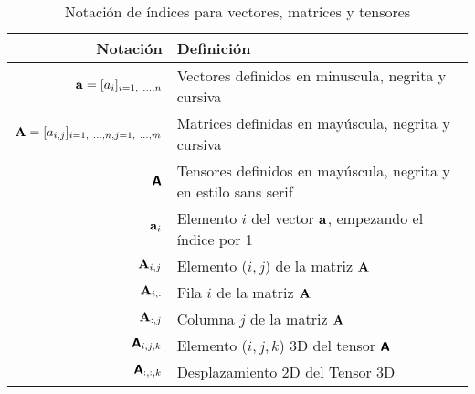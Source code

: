 \begin{table}[H]
    \begin{center}
        \begin{tabularx}{\textwidth}{|r|X|}
            \hline
            \textbf{Notación}                                                 & \textbf{Definición}                                                 \\
            \hline
            $ \mathit{\mathbf{{a}}} = [a_{i}]_{i=1, ~\ldots, n} $                    & Vectores definidos en minuscula, negrita y cursiva                  \\
            $ \mathit{\mathbf{{A}}} = [a_{i,j}]_{i=1, ~\ldots, n, j=1, ~\ldots, m} $ & Matrices definidas en mayúscula, negrita y cursiva                  \\
            $ \boldsymbol{\mathsf{{A}}} $                                                & Tensores definidos en mayúscula, negrita y en estilo sans serif     \\
            \hline
            ${ \mathit{\mathbf{{a}}}_{i} }$                                          & Elemento $i$ del vector $\mathit{\mathbf{{a}}}$, empezando el índice por 1 \\
            ${ \mathit{\mathbf{{A}}}_{i,j} }$                                        & Elemento ($i,j$) de la matriz $\mathit{\mathbf{{A}}}$                      \\
            ${ \mathit{\mathbf{{A}}}_{i,:} }$                                        & Fila $i$ de la matriz $\mathit{\mathbf{{A}}}$                              \\
            ${ \mathit{\mathbf{{A}}}_{:,j} }$                                        & Columna $j$ de la matriz $\mathit{\mathbf{{A}}}$                           \\
            ${ \boldsymbol{\mathsf{{A}}}_{i,j,k} }$                                      & Elemento ($i,j,k$) 3D del tensor $\boldsymbol{\mathsf{{A}}}$                   \\
            ${ \boldsymbol{\mathsf{{A}}}_{:,:,k} }$                                      & Desplazamiento 2D del Tensor 3D                                     \\
            \hline
        \end{tabularx}
        \caption{Notación de índices para vectores, matrices y tensores}
        \label{tab:nnotation-part-v-1}
    \end{center}
\end{table}

